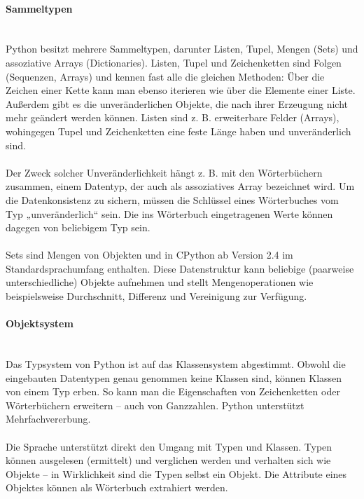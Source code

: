 \paragraph{Sammeltypen}\ \\
Python besitzt mehrere Sammeltypen, darunter Listen, Tupel, Mengen (Sets) und assoziative Arrays (Dictionaries). Listen, Tupel und Zeichenketten sind Folgen (Sequenzen, Arrays) und kennen fast alle die gleichen Methoden: Über die Zeichen einer Kette kann man ebenso iterieren wie über die Elemente einer Liste. Außerdem gibt es die unveränderlichen Objekte, die nach ihrer Erzeugung nicht mehr geändert werden können. Listen sind z. B. erweiterbare Felder (Arrays), wohingegen Tupel und Zeichenketten eine feste Länge haben und unveränderlich sind.\\
\\
Der Zweck solcher Unveränderlichkeit hängt z. B. mit den Wörterbüchern zusammen, einem Datentyp, der auch als assoziatives Array bezeichnet wird. Um die Datenkonsistenz zu sichern, müssen die Schlüssel eines Wörterbuches vom Typ „unveränderlich“ sein. Die ins Wörterbuch eingetragenen Werte können dagegen von beliebigem Typ sein.\\
\\
Sets sind Mengen von Objekten und in CPython ab Version 2.4 im Standardsprachumfang enthalten. Diese Datenstruktur kann beliebige (paarweise unterschiedliche) Objekte aufnehmen und stellt Mengenoperationen wie beispielsweise Durchschnitt, Differenz und Vereinigung zur Verfügung.

\paragraph{Objektsystem}\ \\

Das Typsystem von Python ist auf das Klassensystem abgestimmt. Obwohl die eingebauten Datentypen genau genommen keine Klassen sind, können Klassen von einem Typ erben. So kann man die Eigenschaften von Zeichenketten oder Wörterbüchern erweitern – auch von Ganzzahlen. Python unterstützt Mehrfachvererbung.\\
\\
Die Sprache unterstützt direkt den Umgang mit Typen und Klassen. Typen können ausgelesen (ermittelt) und verglichen werden und verhalten sich wie Objekte – in Wirklichkeit sind die Typen selbst ein Objekt. Die Attribute eines Objektes können als Wörterbuch extrahiert werden.

